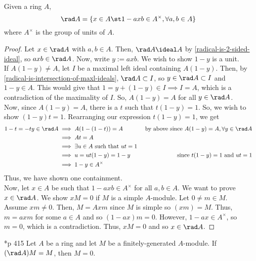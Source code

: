 \documentclass[11pt,leqno,oneside]{amsbook}
\numberwithin{thm}{section}
\begin{document}
\begin{thm}\label{one-minus-radical-is-unit}
  Given a ring \(A\), \[
    \rad A = \{x \in A \st 1-axb \in A^\times, \forall a,b \in A\}
  \]
  where \(A^\times\) is the group of units of \(A\).
\end{thm}
\begin{proof}
  Let \(x \in \rad A\) with \(a,b \in A\). Then, \(\rad A \ideal A\)
  by \ref{radical-is-2-sided-ideal}, so \(axb \in \rad A\). Now, write
  \(y := axb\). We wish to show \(1-y\) is a unit. \\

  If \(A(1-y) \neq A\), let \(I\) be a maximal left ideal containing
  \(A(1-y)\). Then, by \ref{radical-is-intersection-of-maxl-ideals},
  \(\rad A \subset I\), so \(y \in \rad A \subset I\) and \(1-y \in
  A\). This would give that \(1 = y + (1-y) \in I \implies I = A\),
  which is a contradiction of the maximality of \(I\). So, \(A(1-y) =
  A\) for all \(y \in \rad A\). \\

  Now, since \(A(1-y) = A\), there is a \(t\) such that \(t(1-y) =
  1\). So, we wish to show \((1-y)t = 1\). Rearranging our expression
  \(t(1-y) = 1\), we get
  \begin{align*}
    1-t = -ty \in \rad A
    & \implies A(1-(1-t)) = A
    & \text{ by above since }A(1-y) = A, \forall y \in \rad A \\
    & \implies At = A \\
    & \implies \exists u \in A \text{ such that } ut=1 \\
    & \implies u = ut(1-y) = 1-y
    & \text{since }t(1-y)=1 \text{ and }ut=1 \\
    & \implies 1-y \in A^\times
  \end{align*}
  Thus, we have shown one containment. \\

  Now, let \(x \in A\) be such that \(1-axb \in A^\times\) for all
  \(a,b \in A\). We want to prove \(x \in \rad A\). We show \(xM = 0\)
  if \(M\) is a simple \(A\)-module. Let \(0 \neq m \in M\). Assume
  \(xm \neq 0\). Then, \(M = Axm\) since \(M\) is simple so \((xm) =
  M\). Thus, \(m = axm\) for some \(a \in A\) and so \((1-ax)m =
  0\). However, \(1-ax \in A^\times\), so \(m = 0\), which is a
  contradiction. Thus, \(xM = 0\) and so \(x \in \rad A\).
\end{proof}
\begin{thm}\label{nakayamas-lemma}
  \cite{jacobson}*{p 415} Let \(A\) be a ring and let \(M\) be a finitely-generated
  \(A\)-module. If \((\rad A)M = M\), then \(M = 0\).
\end{thm}
\end{document}
